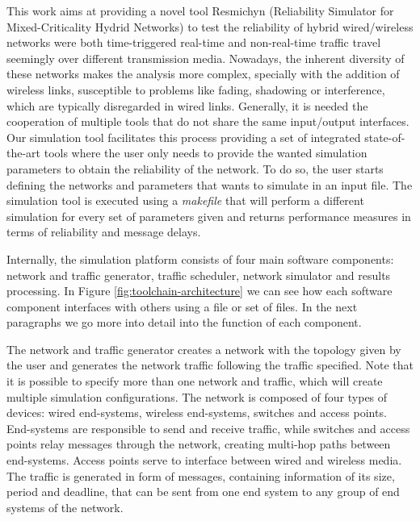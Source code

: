 \documentclass[conference]{IEEEtran}
\begin{document}

This work aims at providing a novel tool Resmichyn (Reliability Simulator for Mixed-Criticality Hydrid Networks) to test the reliability of hybrid wired/wireless networks were both time-triggered real-time and non-real-time traffic travel seemingly over different transmission media. Nowadays, the inherent diversity of these networks makes the analysis more complex, specially with the addition of wireless links, susceptible to problems like fading, shadowing or interference, which are typically disregarded in wired links. Generally, it is needed the cooperation of multiple tools that do not share the same input/output interfaces. Our simulation tool facilitates this process providing a set of integrated state-of-the-art tools where the user only needs to provide the wanted simulation parameters to obtain the reliability of the network. To do so, the user starts defining the networks and parameters that wants to simulate in an input file. The simulation tool is executed using a \textit{makefile} that will perform a different simulation for every set of parameters given and returns performance measures in terms of reliability and message delays.




Internally, the simulation platform consists of four main software components: network and traffic generator, traffic scheduler, network simulator and results processing. In Figure \ref{fig:toolchain-architecture} we can see how each software component interfaces with others using a file or set of files. In the next paragraphs we go more into detail into the function of each component.

The network and traffic generator creates a network with the topology given by the user and generates the network traffic following the traffic specified. Note that it is possible to specify more than one network and traffic, which will create multiple simulation configurations. The network is composed of four types of devices: wired end-systems, wireless end-systems, switches and access points. End-systems are responsible to send and receive traffic, while switches and access points relay messages through the network, creating multi-hop paths between end-systems. Access points serve to interface between wired and wireless media. The traffic is generated in form of messages, containing information of its size, period and deadline, that can be sent from one end system to any group of end systems of the network.
\end{document}
